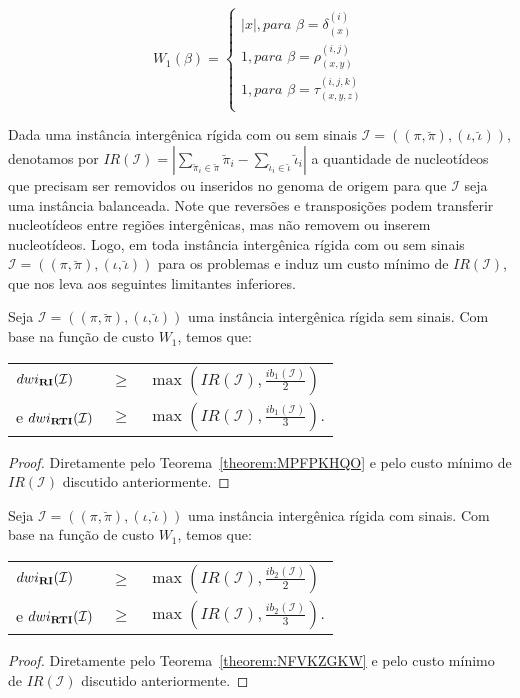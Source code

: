 $$
  W_1(\beta) = \begin{cases}
      |x|, \textit{para } \beta = \delta_{(x)}^{(i)} \\
      1, \textit{para } \beta = \rho_{(x,y)}^{(i,j)} \\
      1, \textit{para } \beta = \tau_{(x,y,z)}^{(i,j,k)} \\
  \end{cases}
$$

Dada uma instância intergênica rígida com ou sem sinais $\mathcal{I}=((\pi,\breve\pi),(\iota,\breve\iota))$, denotamos por $IR(\mathcal{I}) = |\sum_{\breve\pi_i \in \breve\pi} \breve\pi_i - \sum_{\breve\iota_i \in \breve\iota} \breve\iota_i|$ a quantidade de nucleotídeos que precisam ser removidos ou inseridos no genoma de origem para que $\mathcal{I}$ seja uma instância balanceada. Note que reversões e transposições podem transferir nucleotídeos entre regiões intergênicas, mas não removem ou inserem nucleotídeos. Logo, em toda instância intergênica rígida com ou sem sinais $\mathcal{I}=((\pi,\breve\pi),(\iota,\breve\iota))$ para os problemas \SbWIRI{} e \SbWIRTI{} induz um custo mínimo de $IR(\mathcal{I})$, que nos leva aos seguintes limitantes inferiores.

\begin{theorem}\label{theorem:IQACALLP}
Seja $\mathcal{I} = ((\pi,\breve\pi),(\iota,\breve\iota))$ uma instância intergênica rígida sem sinais. Com base na função de custo $W_1$, temos que:

\begin{tabular}{lll}
  $dwi_{\textbf{RI}}(\mathcal{I})$      & $ \ge $ & $\max(IR(\mathcal{I}),\frac{ib_1(\mathcal{I})}{2})$ \\ 
  e $dwi_{\textbf{RTI}}(\mathcal{I})$     & $ \ge $ & $\max(IR(\mathcal{I}),\frac{ib_1(\mathcal{I})}{3})$.
\end{tabular}
\begin{proof}
Diretamente pelo Teorema~\ref{theorem:MPFPKHQO} e pelo custo mínimo de $IR(\mathcal{I})$ discutido anteriormente.
\end{proof}
\end{theorem}

\begin{theorem}\label{theorem:BOZETXBS}
Seja $\mathcal{I} = ((\pi,\breve\pi),(\iota,\breve\iota))$  uma instância intergênica rígida com sinais. Com base na função de custo $W_1$, temos que:

\begin{tabular}{lll}
  $dwi_{\textbf{RI}}(\mathcal{I})$      & $ \ge $ & $\max(IR(\mathcal{I}),\frac{ib_2(\mathcal{I})}{2})$ \\ 
  e $dwi_{\textbf{RTI}}(\mathcal{I})$     & $ \ge $ & $\max(IR(\mathcal{I}),\frac{ib_2(\mathcal{I})}{3})$.
\end{tabular}
\begin{proof}
Diretamente pelo Teorema~\ref{theorem:NFVKZGKW} e pelo custo mínimo de $IR(\mathcal{I})$ discutido anteriormente.
\end{proof}
\end{theorem}

